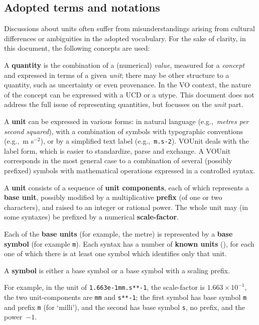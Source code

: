 \documentclass[11pt,a4paper]{ivoa}
\newcommand{\unit}[1]{\texttt{\small\color{orange}#1}}
\def\eg{e.g.,~}
\begin{document}
\subsection{Adopted terms and notations\label{sec:notations}}

Discussions about units often suffer from misunderstandings arising from cultural
differences or ambiguities in the adopted vocabulary. For the sake of clarity, in this 
document, the following concepts are used:

A \textbf{quantity} is the combination of a (numerical) {\em
value}, measured for a {\em concept} and expressed in terms of a given
{\em unit}; there may be other structure to a quantity, such as
uncertainty or even provenance. 
In the VO context, the nature of the concept can be expressed with a UCD or a utype. This document does not address the full issue of
representing quantities, but focusses on the {\em unit} part.

A \textbf{unit} can be expressed in various forms: in natural language
(\eg \emph{metres per second squared}), with a combination of symbols
with typographic conventions (\eg m s$^{-2}$), or by a simplified text
label (\eg \unit{m.s-2}). VOUnit deals with the label form, which is
easier to standardize, parse and exchange. A VOUnit corresponds in the
most general case to a combination of several (possibly prefixed)
symbols with mathematical operations expressed in a controlled syntax.

A \textbf{unit} consists of a sequence of \textbf{unit components},
each of which represents a \textbf{base unit}, possibly modified by a
multiplicative \textbf{prefix} (of one or two characters), and raised
to an integer or rational power.  The whole unit may (in some
syntaxes) be prefixed by a numerical \textbf{scale-factor}.

Each of the \textbf{base units} (for example, the metre) is
represented by a \textbf{base symbol} (for example \unit{m}).  Each
syntax has a number of \textbf{known units}
(), for each one of which there is at least
one symbol which identifies only that unit.

A \textbf{symbol} is either a base symbol or a base symbol with a
scaling prefix.

For example, in the unit of \unit{1.663e-1mm.s**-1}, the scale-factor
is $1.663\times10^{-1}$, the two unit-components are \texttt{mm}
and \texttt{s**-1}; the first symbol has base symbol \texttt{m} and
prefix \texttt{m} (for `milli'), and the second has base
symbol \texttt{s}, no prefix, and the power~$-1$.
\end{document}
